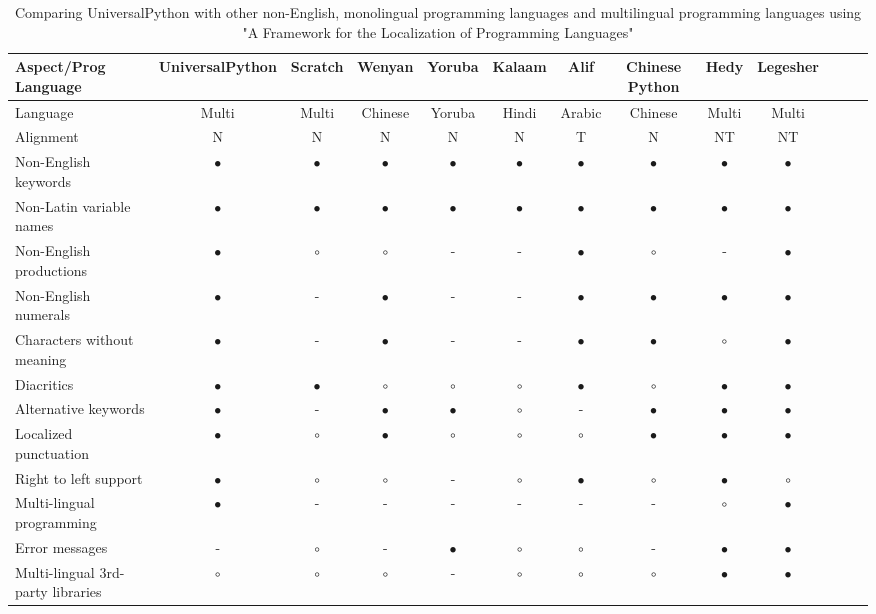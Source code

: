 \documentclass[conference]{IEEEtran}
\begin{document}
\begin{table}[t]
  \caption{Comparing UniversalPython with other non-English, monolingual programming languages and multilingual programming languages using "A Framework for the Localization of Programming Languages" \cite{swidan2023framework}}
  \centering
  \begin{tabularx}{\textwidth}{l *{12}{c}}
  \hline
 Aspect/Prog Language & UniversalPython & Scratch & Wenyan & Yoruba & Kalaam & Alif & Chinese Python & Hedy & Legesher \\
  \hline
 Language & Multi & Multi & Chinese & Yoruba & Hindi & Arabic & Chinese & Multi & Multi \\
 Alignment & N & N & N & N & N & T & N & NT & NT \\
 Non-English keywords & $\bullet$ & $\bullet$ & $\bullet$ & $\bullet$ & $\bullet$ & $\bullet$ & $\bullet$ & $\bullet$ & $\bullet$ \\
 Non-Latin variable names & $\bullet$ & $\bullet$ & $\bullet$ & $\bullet$ & $\bullet$ & $\bullet$ & $\bullet$ & $\bullet$ & $\bullet$ \\
 Non-English productions & $\bullet$ & $\circ$ & $\circ$ & - & - & $\bullet$ & $\circ$ & - & $\bullet$ \\
 Non-English numerals & $\bullet$ & - & $\bullet$ & - & - & $\bullet$ & $\bullet$ & $\bullet$ & $\bullet$ \\
 Characters without meaning & $\bullet$ & - & $\bullet$ & - & - & $\bullet$ & $\bullet$ & $\circ$ & $\bullet$ \\
 Diacritics & $\bullet$ & $\bullet$ & $\circ$ & $\circ$ & $\circ$ & $\bullet$ & $\circ$ & $\bullet$ & $\bullet$ \\
 Alternative keywords & $\bullet$ & - & $\bullet$ & $\bullet$ & $\circ$ & - & $\bullet$ & $\bullet$ & $\bullet$ \\
 Localized punctuation & $\bullet$ & $\circ$ & $\bullet$ & $\circ$ & $\circ$ & $\circ$ & $\bullet$ & $\bullet$ & $\bullet$ \\
 Right to left support & $\bullet$ & $\circ$ & $\circ$ & - & $\circ$ & $\bullet$ & $\circ$ & $\bullet$ & $\circ$ \\
 Multi-lingual programming & $\bullet$ & - & - & - & - & - & - & $\circ$ & $\bullet$ \\
 Error messages & - & $\circ$ & - & $\bullet$ & $\circ$ & $\circ$ & - & $\bullet$ & $\bullet$ \\
 Multi-lingual 3rd-party libraries & $\circ$ & $\circ$ & $\circ$ & - & $\circ$ & $\circ$ & $\circ$ & $\bullet$ & $\bullet$ \\
  \hline
  \end{tabularx}
  \end{table}
  
\end{document}
